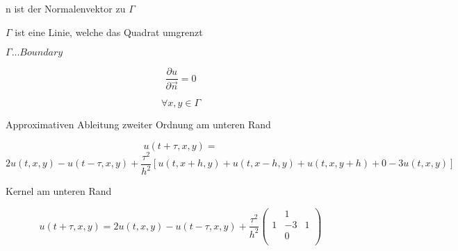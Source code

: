 \documentclass[10pt,a4paper]{article}
\begin{document}
n ist der Normalenvektor zu $\Gamma $

$\Gamma $ ist eine Linie, welche das Quadrat umgrenzt

$\Gamma ... Boundary$


\[ \frac{\partial u}{\partial \vec{n}} = 0 \]

\[ \forall x,y \in \Gamma \]

Approximativen Ableitung zweiter Ordnung am unteren Rand

\[ u(t+\tau,x,y) = \]
\[  2 u(t,x,y) - u(t-\tau,x,y) + \frac{\tau^2}{h^2}  [ u(t,x+h,y)  + u(t,x-h,y) + u(t,x,y+h) + 0 - 3u(t,x,y) ] \]

Kernel am unteren Rand

\[
u(t+\tau,x,y) = 2 u(t,x,y) - u(t-\tau,x,y) + \frac{\tau^2}{h^2} 
\begin{pmatrix}
  & 1 &  \\
1 & -3 & 1\\
  & 0 & \\
\end{pmatrix}
\]
\end{document}
